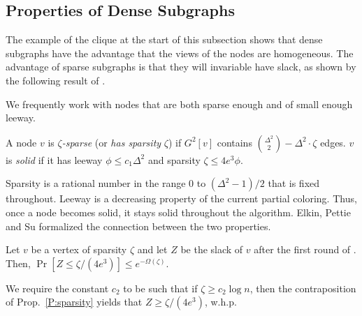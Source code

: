 \subsection{Properties of Dense Subgraphs}
\label{ssec:dense}

The example of the clique at the start of this subsection shows that dense subgraphs have the advantage that the views of the nodes are homogeneous. The advantage of sparse subgraphs is that they will invariable have slack, as shown by the following result of \cite{EPS15}.

We frequently work with nodes that are both sparse enough and of small enough leeway. 

\begin{definition}
A node $v$ is \emph{$\zeta$-sparse} (or \emph{has sparsity} $\zeta$) if $G^2[v]$ contains $\binom{\Delta^2}{2} - \Delta^2\cdot \zeta$ edges. 
$v$ is \emph{solid} if it has leeway $\phi \le c_1 \Delta^2$ and sparsity $\zeta \le 4 e^3 \phi$. 
\label{D:solid}
\end{definition}

Sparsity is a rational number in the range $0$ to $(\Delta^2-1)/2$ that is fixed throughout. Leeway is a decreasing property of the current partial coloring. Thus, once a node becomes solid, it stays solid throughout the algorithm.
Elkin, Pettie and Su \cite{EPS15} formalized the connection between the two properties.


\begin{proposition}[\cite{EPS15}, Lemma 3.1]
Let $v$ be a vertex of sparsity $\zeta$ and let $Z$ be the slack of $v$ after the first round of . Then, 
 $\Pr[Z \le \zeta/(4 e^3)] \le e^{-\Omega(\zeta)}$.
\label{P:sparsity}
\end{proposition}

We require the constant $c_2$ to be such that if $\zeta \ge c_2\log n$, then the contraposition of Prop.~\ref{P:sparsity} yields that $Z \ge \zeta/(4e^3)$, w.h.p. 

